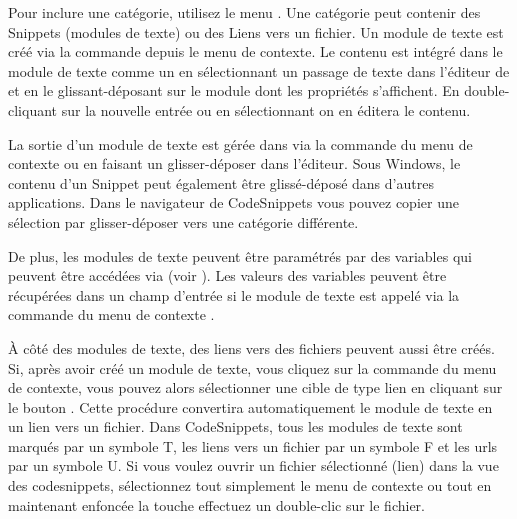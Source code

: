 Pour inclure une catégorie, utilisez le menu . Une catégorie peut contenir des  Snippets (modules de texte) ou des Liens vers un fichier. Un module de texte est créé via la commande  depuis le menu de contexte. Le contenu est intégré dans le module de texte comme un  en sélectionnant un passage de texte dans l'éditeur de \codeblocks et en le glissant-déposant sur le module dont les propriétés s'affichent. En double-cliquant sur la nouvelle entrée ou en sélectionnant   on en éditera le contenu.


La sortie d'un module de texte est gérée dans \codeblocks via la commande  du menu de contexte ou en faisant un glisser-déposer dans l'éditeur. Sous Windows, le contenu d'un Snippet peut également être glissé-déposé dans d'autres applications. Dans le navigateur de CodeSnippets vous pouvez copier une sélection par glisser-déposer vers une catégorie différente.

De plus, les modules de texte peuvent être paramétrés par des variables  qui peuvent être accédées via   (voir ). Les valeurs des variables peuvent être récupérées dans un champ d'entrée si le module de texte est appelé via la commande du menu de contexte .

À côté des modules de texte, des liens vers des fichiers peuvent aussi être créés. Si, après avoir créé un module de texte, vous cliquez sur la commande  du menu de contexte, vous pouvez alors sélectionner une cible de type lien en cliquant sur le bouton . Cette procédure convertira automatiquement le module de texte en un lien vers un fichier. Dans CodeSnippets, tous les modules de texte sont marqués par un symbole T, les liens vers un fichier par un symbole F et les urls par un symbole U. Si vous voulez ouvrir un fichier sélectionné (lien) dans la vue des codesnippets, sélectionnez tout simplement le menu de contexte  ou tout en maintenant enfoncée la touche  effectuez un double-clic sur le fichier.


